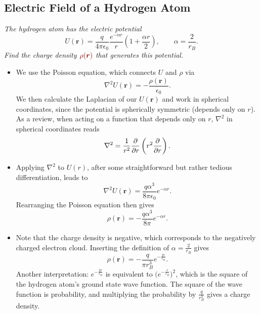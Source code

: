 \documentclass[11pt, a4paper]{article}
\newcommand{\dmath}[1]{\textcolor{Maroon}{#1}}  %
\renewcommand{\vec}[1]{\bm{#1}} %
\renewcommand{\r}{\vec{r}}
\newcommand{\ee}{\epsilon_{0}}  %
\begin{document}
\subsection{Electric Field of a Hydrogen Atom}
\textit{The hydrogen atom has the electric potential}
\begin{equation*}
	U(\r) = \frac{q}{4\pi \ee} \frac{e^{-\alpha r}}{r}\left(1 + \frac{\alpha r}{2}\right), \qquad \alpha = \frac{2}{r_{B}}.
\end{equation*}
\textit{Find the charge density $ \dmath{\rho(\r)} $ that generates this potential.}
\begin{itemize}
	\item We use the Poisson equation, which connects $ U $ and $ \rho $ via
	\begin{equation*}
		\nabla^{2}U(\r) = - \frac{\rho(\r)}{\ee}.
	\end{equation*}
	We then calculate the Laplacian of our $ U(\r) $ and work in spherical coordinates, since the potential is spherically symmetric (depends only on $ r $). As a review, when acting on a function that depends only on $ r $, $ \nabla^{2} $ in spherical coordinates reads
	\begin{equation*}
		\nabla^{2} = \frac{1}{r^{2}} \pdv{}{r}\left(r^{2} \pdv{}{r}\right).
	\end{equation*}
	
	\item Applying $ \nabla^{2} $ to $ U(r) $, after some straightforward but rather tedious differentiation, leads to
	\begin{equation*}
		\nabla^{2}U(\r) = \frac{q\alpha^{3}}{8 \pi \ee}e^{-\alpha r}.
	\end{equation*}
	Rearranging the Poisson equation then gives
	\begin{equation*}
		\rho(\r) = - \frac{q\alpha^{3}}{8 \pi}e^{-\alpha r}.
	\end{equation*}
	
	\item Note that the charge density is negative, which corresponds to the negatively charged electron cloud. Inserting the definition of $ \alpha = \frac{2}{r_{B}}$ gives
	\begin{equation*}
		\rho(\r) = -\frac{q}{\pi r_{B}^{3}} e^{-\frac{2r}{r_{B}}}.
	\end{equation*}
	Another interpretation: $ e^{-\frac{2r}{r_{B}}} $ is equivalent to $ \big(e^{-\frac{r}{r_{B}}}\big)^{2} $, which is the square of the hydrogen atom's ground state wave function. The square of the wave function is probability, and multiplying the probability by $ \frac{q}{r_{B}^{3}} $ gives a charge density. 
	

\end{itemize}
\end{document}
